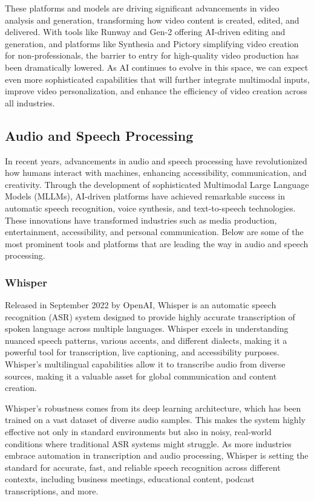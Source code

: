 These platforms and models are driving significant advancements in video analysis and generation, transforming how video content is created, edited, and delivered. 
With tools like Runway and Gen-2 offering AI-driven editing and generation, and platforms like Synthesia and Pictory simplifying video creation for non-professionals, the barrier to entry for high-quality video production has been dramatically lowered. 
As AI continues to evolve in this space, we can expect even more sophisticated capabilities that will further integrate multimodal inputs, improve video personalization, and enhance the efficiency of video creation across all industries.

\subsection{Audio and Speech Processing}

In recent years, advancements in audio and speech processing have revolutionized how humans interact with machines, enhancing accessibility, communication, and creativity. 
Through the development of sophisticated Multimodal Large Language Models (MLLMs), AI-driven platforms have achieved remarkable success in automatic speech recognition, voice synthesis, and text-to-speech technologies. 
These innovations have transformed industries such as media production, entertainment, accessibility, and personal communication. 
Below are some of the most prominent tools and platforms that are leading the way in audio and speech processing.

\subsubsection{Whisper}

Released in September 2022 by OpenAI, Whisper is an automatic speech recognition (ASR) system designed to provide highly accurate transcription of spoken language across multiple languages. 
Whisper excels in understanding nuanced speech patterns, various accents, and different dialects, making it a powerful tool for transcription, live captioning, and accessibility purposes. 
Whisper’s multilingual capabilities allow it to transcribe audio from diverse sources, making it a valuable asset for global communication and content creation.

Whisper’s robustness comes from its deep learning architecture, which has been trained on a vast dataset of diverse audio samples. 
This makes the system highly effective not only in standard environments but also in noisy, real-world conditions where traditional ASR systems might struggle. 
As more industries embrace automation in transcription and audio processing, Whisper is setting the standard for accurate, fast, and reliable speech recognition across different contexts, including business meetings, educational content, podcast transcriptions, and more.

